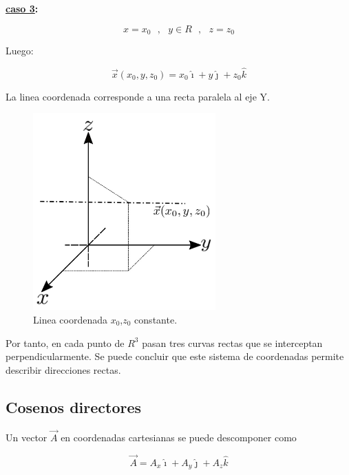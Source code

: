 \documentclass[12pt]{report}
\begin{document}
\textbf{\underline{caso 3}:} 

\begin{equation} \nonumber
x = x_0 \ \ \ ,\ \ \ y \in R \ \ \ ,  \ \ \ z=z_0
\end{equation}

Luego:

\begin{equation} \nonumber
\vec{x}(x_0,y,z_0)= x_0\hat{\imath} + y \hat{\jmath} + z_0 \hat{k}
\end{equation}

La linea coordenada corresponde a una recta paralela al eje Y. \\


\begin{figure}
	\centering
	\includegraphics[width=7cm]{figura5.png}
	\caption{ Linea coordenada $x_0$,$z_0$ constante.}
	\label{fig.1}
\end{figure}


 Por tanto, en cada punto de $R^3$ pasan tres curvas rectas que se interceptan perpendicularmente. Se puede concluir que este sistema de coordenadas permite describir direcciones rectas. 
 
 
 
 
 
  
 
 
 
 \subsection{Cosenos directores}
Un vector $\vec{A}$ en coordenadas cartesianas se puede descomponer como

\begin{equation}
\vec{A}=A_x \hat{\imath} + A_y \hat{\jmath} + A_z \hat{k}
\end{equation}
\end{document}
